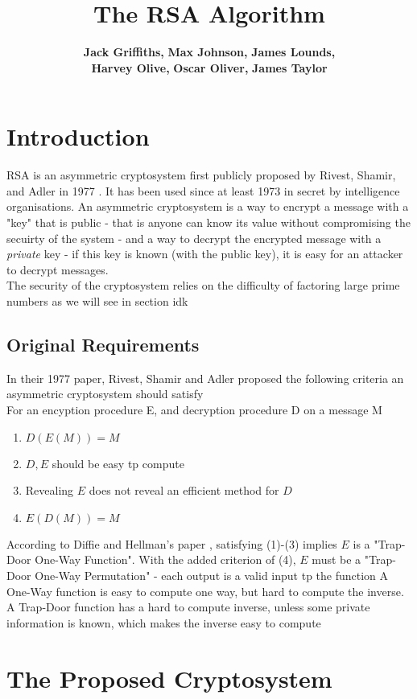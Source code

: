\documentclass{article}
\author{
    {\bf Jack Griffiths,}
    {\bf Max Johnson,}
    {\bf James Lounds, } \\
    {\bf Harvey Olive, }
    {\bf Oscar Oliver, }
    {\bf James Taylor}
}
\title{The RSA Algorithm}
\begin{document}
\maketitle
\newpage

\section{Introduction}
RSA is an asymmetric cryptosystem first publicly proposed by Rivest, Shamir, and Adler in 1977 \cite{RSA}.
It has been used since at least 1973 in secret by intelligence organisations.
An asymmetric cryptosystem is a way to encrypt a message with a "key" that is public
- that is anyone can know its value without compromising the secuirty of the system -
and a way to decrypt the encrypted message with a \emph{private} key
- if this key is known (with the public key), it is easy for an attacker to decrypt messages.
\\
The security of the cryptosystem relies on the difficulty of factoring large prime numbers as we will see in section idk
\subsection{Original Requirements}
In their 1977 paper, Rivest, Shamir and Adler proposed the following criteria an asymmetric cryptosystem should satisfy
\\For an encyption procedure E, and decryption procedure D on a message M
\begin{enumerate}
    \item $D(E(M)) = M$
    \item $D, E$ should be easy tp compute
    \item Revealing $E$ does not reveal an efficient method for $D$
    \item $E(D(M)) = M$
\end{enumerate}
According to Diffie and Hellman's paper \cite{Directions}, satisfying (1)-(3) implies $E$ is a "Trap-Door One-Way Function".
With the added criterion of (4), $E$ must be  a "Trap-Door One-Way Permutation" - each output is a valid input tp the function
A One-Way function is easy to compute one way, but hard to compute the inverse.
A Trap-Door function has a hard to compute inverse, unless some private information is known, which makes the inverse easy to compute

\newpage
\section{The Proposed Cryptosystem}
\end{document}
